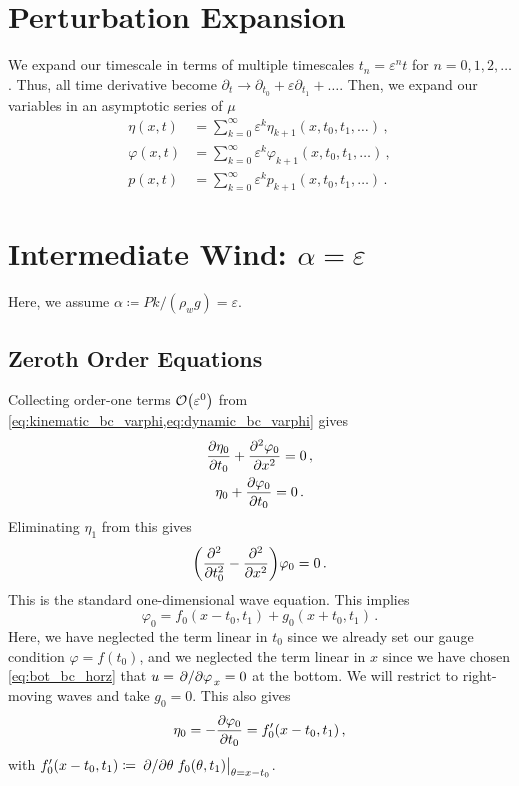 \documentclass{jfm}
\renewcommand*{\epsilon}{\varepsilon}
\begin{document}
\section{Perturbation Expansion}
\label{sec:shallow_water}
We expand our timescale in terms of multiple timescales $t_n =
\epsilon^n t$ for $n= 0,1,2,\ldots$.
Thus, all time derivative become $\partial_t \to \partial_{t_0} +
\epsilon \partial_{t_1} + \ldots$.
Then, we expand our variables in an asymptotic series of $\mu$
\begin{align}
  \eta(x,t) &= \sum_{k=0}^{\infty} \epsilon^k
    \eta_{k+1}(x,t_0,t_1,\ldots) \,, \\
  \varphi(x,t) &= \sum_{k=0}^{\infty} \epsilon^k
    \varphi_{k+1}(x,t_0,t_1,\ldots) \,, \\
  p(x,t) &= \sum_{k=0}^{\infty} \epsilon^k p_{k+1}(x,t_0,t_1,\ldots)
    \,.
\end{align}

\section{\label{sec:intermediate} \texorpdfstring{Intermediate Wind:
$\alpha = \epsilon$}{Intermediate Wind}}
Here, we assume $\alpha \coloneqq P k/(\rho_w g) = \epsilon$.
\subsection{Zeroth Order Equations}
Collecting order-one terms $\order{\epsilon^0}$ from
\cref{eq:kinematic_bc_varphi,eq:dynamic_bc_varphi} gives
\begin{gather}
  \pdv{\eta_0}{t_0} + \pdv[2]{\varphi_0}{x} = 0 \,, \\
  \eta_0 + \pdv{\varphi_0}{t_0} = 0 \,.
\end{gather}
Eliminating $\eta_1$ from this gives
\begin{equation}
  \pqty{\pdv[2]{t_0} - \pdv[2]{x} } \varphi_0 = 0 \,.
  \label{eq:wave_eq}
\end{equation}
This is the standard one-dimensional wave equation.
This implies
\begin{equation}
  \varphi_0 = f_0(x-t_0,t_1) + g_0(x+t_0,t_1) \,.
  \label{eq:phi0_sol}
\end{equation}
Here, we have neglected the term linear in $t_0$ since we already set
our gauge condition $\varphi = f(t_0)$, and we neglected the term linear
in $x$ since we have chosen \cref{eq:bot_bc_horz} that $u =
\pdv*{\varphi}_x = 0$ at the bottom.
We will restrict to right-moving waves and take $g_0 = 0$.
This also gives
\begin{equation}
  \eta_0 = - \pdv{\varphi_0}{t_0} = f_0'(x-t_0,t_1) \,,
  \label{eq:eta0_sol}
\end{equation}
with $f_0'(x-t_0,t_1) \coloneqq \eval{\pdv*{\theta}
f_0(\theta,t_1)}_{\theta = x-t_0}$.
\end{document}
